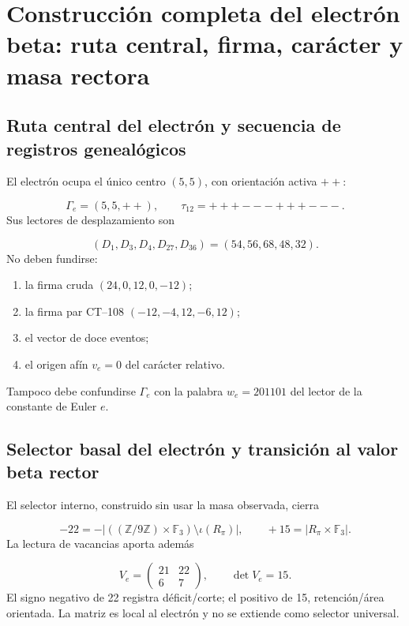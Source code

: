 \section{Construcción completa del electrón beta: ruta central, firma, carácter y masa rectora}
\subsection{Ruta central del electrón y secuencia de registros genealógicos}
El electrón ocupa el único centro \((5,5)\), con orientación activa \(++\):

\[
 \Gamma_e=(5,5,++),\qquad
 \tau_{12}=+++---+++---.
\]
Sus lectores de desplazamiento son

\[
 (D_1,D_3,D_4,D_{27},D_{36})=(54,56,68,48,32).
\]
No deben fundirse:

\begin{enumerate}
\item la firma cruda \((24,0,12,0,-12)\);
\item la firma par CT--108 \((-12,-4,12,-6,12)\);
\item el vector de doce eventos;
\item el origen afín \(v_e=0\) del carácter relativo.
\end{enumerate}
Tampoco debe confundirse \(\Gamma_e\) con la palabra \(w_e=201101\) del lector de la constante de Euler \(e\).

\subsection{Selector basal del electrón y transición al valor beta rector}
El selector interno, construido sin usar la masa observada, cierra

\[
 -22=-\left|((\mathbb Z/9\mathbb Z)\times\mathbb F_3)\setminus\iota(R_\pi)\right|,
 \qquad
 +15=|R_\pi\times\mathbb F_3|.
\]
La lectura de vacancias aporta además

\[
 V_e=\begin{pmatrix}21&22\\6&7\end{pmatrix},\qquad
 \det V_e=15.
\]
El signo negativo de 22 registra déficit/corte; el positivo de 15, retención/área orientada. La matriz es local al electrón y no se extiende como selector universal.

